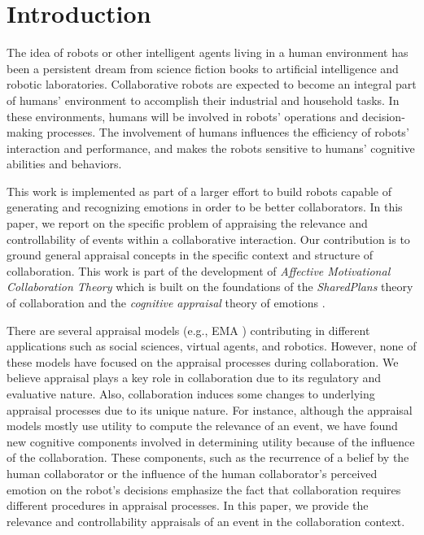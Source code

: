 \documentclass{sig-alternate-05-2015}
\begin{document}


\section{Introduction}
The idea of robots or other intelligent agents living in a human environment has
been a persistent dream from science fiction books to artificial intelligence
and robotic laboratories. Collaborative robots are expected to become an
integral part of humans' environment to accomplish their industrial and
household tasks. In these environments, humans will be involved in robots'
operations and decision-making processes. The involvement of humans influences
the efficiency of robots' interaction and performance, and makes the robots
sensitive to humans' cognitive abilities and behaviors.

This work is implemented as part of a larger effort to build robots capable of
generating and recognizing emotions in order to be better collaborators. In this
paper, we report on the specific problem of appraising the relevance and
controllability of events within a collaborative interaction. Our contribution
is to ground general appraisal concepts in the specific context and structure of
collaboration. This work is part of the development of \textit{Affective
Motivational Collaboration Theory} which is built on the foundations of the
\textit{SharedPlans} theory of collaboration \cite{grosz:plans-discourse} and
the \textit{cognitive appraisal} theory of emotions
\cite{gratch:domain-independent}.

There are several appraisal models (e.g., EMA \cite{marsella:ema-process-model})
contributing in different applications such as social sciences, virtual agents,
and robotics. However, none of these models have focused on the appraisal
processes during collaboration. We believe appraisal plays a key role in
collaboration due to its regulatory and evaluative nature. Also, collaboration
induces some changes to underlying appraisal processes due to its unique nature.
For instance, although the appraisal models mostly use utility to compute the
relevance of an event, we have found new cognitive components involved in
determining utility because of the influence of the collaboration. These
components, such as the recurrence of a belief by the human collaborator or the
influence of the human collaborator's perceived emotion on the robot's decisions
emphasize the fact that collaboration requires different procedures in appraisal
processes. In this paper, we provide the relevance and controllability
appraisals of an event in the collaboration context.
\end{document}
